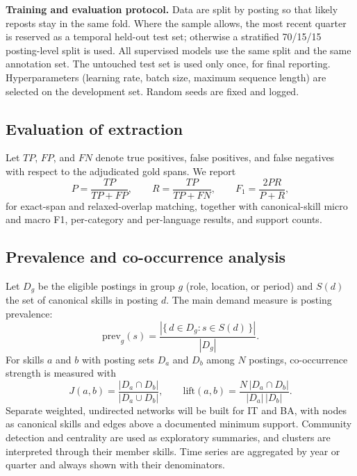 \documentclass[12pt,a4paper]{article}
\begin{document}
\textbf{Training and evaluation protocol.}
Data are split by posting so that likely reposts stay in the same fold.
Where the sample allows, the most recent quarter is reserved as a temporal
held-out test set; otherwise a stratified 70/15/15 posting-level split is
used. All supervised models use the same split and the same annotation
set. The untouched test set is used only once, for final reporting.
Hyperparameters (learning rate, batch size, maximum sequence length) are
selected on the development set. Random seeds are fixed and logged.

\subsection{Evaluation of extraction}
Let $TP$, $FP$, and $FN$ denote true positives, false positives, and false
negatives with respect to the adjudicated gold spans. We report
\begin{equation}
  P = \frac{TP}{TP+FP}, \qquad
  R = \frac{TP}{TP+FN}, \qquad
  F_1 = \frac{2PR}{P+R},
\end{equation}
for exact-span and relaxed-overlap matching, together with canonical-skill
micro and macro F1, per-category and per-language results, and support
counts.

\subsection{Prevalence and co-occurrence analysis}
Let $D_g$ be the eligible postings in group $g$ (role, location, or period)
and $S(d)$ the set of canonical skills in posting $d$. The main demand
measure is posting prevalence:
\begin{equation}
  \text{prev}_g(s) = \frac{\left|\{\, d \in D_g : s \in S(d) \,\}\right|}{|D_g|}.
\end{equation}
For skills $a$ and $b$ with posting sets $D_a$ and $D_b$ among $N$ postings,
co-occurrence strength is measured with
\begin{equation}
  J(a,b) = \frac{|D_a \cap D_b|}{|D_a \cup D_b|}, \qquad
  \text{lift}(a,b) = \frac{N\,|D_a \cap D_b|}{|D_a|\,|D_b|}.
\end{equation}
Separate weighted, undirected networks will be built for IT and BA, with
nodes as canonical skills and edges above a documented minimum support.
Community detection and centrality are used as exploratory summaries, and
clusters are interpreted through their member skills. Time series are
aggregated by year or quarter and always shown with their denominators.
\end{document}
